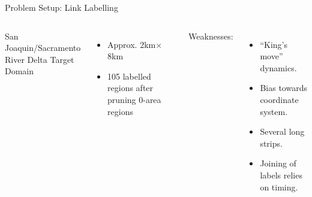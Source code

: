 \documentclass[xcolor=pdflatex,dvipsnames,table]{beamer}
\begin{document}
\begin{frame}{Problem Setup: Link Labelling}
\begin{columns}[c]
San Joaquin/Sacramento River Delta Target Domain
\begin{itemize}
 \item Approx. 2km$\times$8km 
 \item 105 labelled regions after pruning 0-area regions
\end{itemize}

Weaknesses:
\begin{itemize}
 \item ``King's move'' dynamics.
 \item Bias towards coordinate system.
 \item Several long strips.
 \item Joining of labels relies on timing.
\end{itemize}



\end{columns}
\end{frame}
\end{document}

